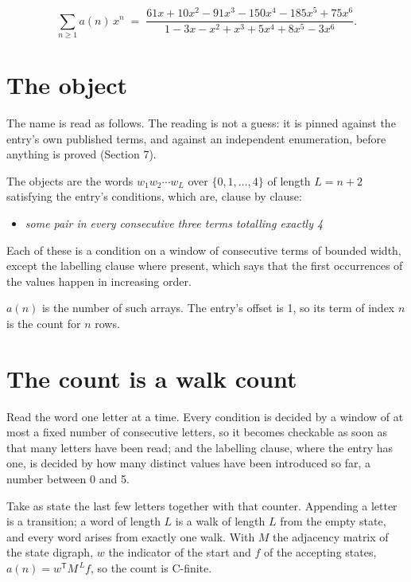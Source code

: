 \documentclass[11pt]{article}
\theoremstyle{definition}
\begin{document}
\[\sum_{n \ge 1} a(n)\,x^n \;=\; \frac{61x + 10x^{2} - 91x^{3} - 150x^{4} - 185x^{5} + 75x^{6}}{1 - 3x - x^{2} + x^{3} + 5x^{4} + 8x^{5} - 3x^{6}}.\]

\section{The object}

The name is read as follows. The reading is not a guess: it is pinned against the entry's own published terms, and against an independent enumeration, before anything is proved (Section 7).

The objects are the words $w_1 w_2 \cdots w_L$ over $\{0,1,\dots,4\}$ of length $L = n + 2$ satisfying the entry's conditions, which are, clause by clause:

\begin{itemize}

\item {\itshape some pair in every consecutive three terms totalling exactly 4}

\end{itemize}

Each of these is a condition on a window of consecutive terms of bounded width, except the labelling clause where present, which says that the first occurrences of the values happen in increasing order.

$a(n)$ is the number of such arrays. The entry's offset is 1, so its term of index $n$ is the count for $n$ rows.

\section{The count is a walk count}

Read the word one letter at a time. Every condition is decided by a window of at most a fixed number of consecutive letters, so it becomes checkable as soon as that many letters have been read; and the labelling clause, where the entry has one, is decided by how many distinct values have been introduced so far, a number between $0$ and 5.

Take as state the last few letters together with that counter. Appending a letter is a transition; a word of length $L$ is a walk of length $L$ from the empty state, and every word arises from exactly one walk. With $M$ the adjacency matrix of the state digraph, $w$ the indicator of the start and $f$ of the accepting states, $a(n) = w^{\mathsf T}M^{\,L}f$, so the count is C-finite.
\end{document}
